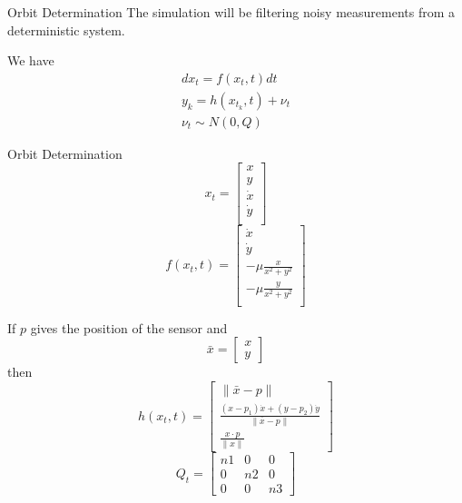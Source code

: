 \documentclass{beamer}
\begin{document}
\begin{frame}{Orbit Determination}
  The simulation will be filtering noisy measurements from a deterministic
  system.

  \pause
  We have
  \begin{align}
    dx_t = f(x_t,t)dt \\
    y_k = h(x_{t_k}, t) + \nu_t\\
    \nu_t \sim N(0,Q) 
  \end{align}

\end{frame}
\begin{frame}{Orbit Determination}
  \begin{equation}
    x_t = \begin{bmatrix}
      x \\
      y \\
      \dot{x} \\
      \dot{y} \\
    \end{bmatrix}
  \end{equation}
  \begin{equation}
    f(x_t,t) = \begin{bmatrix}
      \dot{x} \\
      \dot{y} \\
      - \mu \frac{x}{x^2 + y^2} \\
      - \mu \frac{y}{x^2 + y^2} \\
    \end{bmatrix}
  \end{equation}
\end{frame}

\begin{frame}
  If $p$ gives the position of the sensor and
  \begin{equation}
    \bar{x} = \begin{bmatrix}
      x \\
      y
    \end{bmatrix}
  \end{equation}
  then
  \begin{equation}
    h(x_t,t) = \begin{bmatrix}
      \lVert \bar{x} - p \rVert \\
      \frac{(x - p_1) \dot{x} + (y - p_2) \dot{y}}{\lVert \bar{x} - p \rVert }\\
      \frac{x \cdot p}{\lVert x \rVert}
    \end{bmatrix}
  \end{equation}
  \begin{equation}
    Q_t = \begin{bmatrix}
      n1 & 0 & 0 \\
      0 & n2 & 0 \\
      0 & 0 & n3
  \end{bmatrix}
  \end{equation}
\end{frame}
\end{document}
